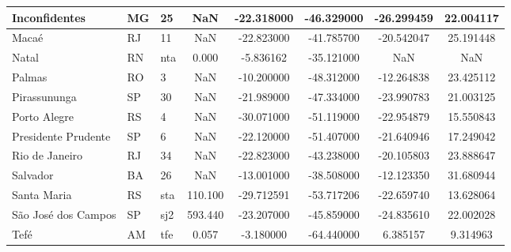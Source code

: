 \begin{table}
\begin{tabular}{|l|l|l|c|c|c|c|c|}
Inconfidentes       &    MG &                    25 &       NaN & -22.318000 & -46.329000 &    -26.299459 &      22.004117   \\ \hline
Macaé               &    RJ &                    11 &       NaN & -22.823000 & -41.785700 &    -20.542047 &      25.191448   \\ \hline
Natal               &    RN &                   nta &     0.000 &  -5.836162 & -35.121000 &           NaN &            NaN   \\ \hline
Palmas              &    RO &                     3 &       NaN & -10.200000 & -48.312000 &    -12.264838 &      23.425112   \\ \hline
Pirassununga        &    SP &                    30 &       NaN & -21.989000 & -47.334000 &    -23.990783 &      21.003125   \\ \hline
Porto Alegre        &    RS &                     4 &       NaN & -30.071000 & -51.119000 &    -22.954879 &      15.550843   \\ \hline
Presidente Prudente &    SP &                     6 &       NaN & -22.120000 & -51.407000 &    -21.640946 &      17.249042   \\ \hline
Rio de Janeiro      &    RJ &                    34 &       NaN & -22.823000 & -43.238000 &    -20.105803 &      23.888647   \\ \hline
Salvador            &    BA &                    26 &       NaN & -13.001000 & -38.508000 &    -12.123350 &      31.680944   \\ \hline
Santa Maria         &    RS &                   sta &   110.100 & -29.712591 & -53.717206 &    -22.659740 &      13.628064   \\ \hline
São José dos Campos &    SP &                   sj2 &   593.440 & -23.207000 & -45.859000 &    -24.835610 &      22.002028   \\ \hline
Tefé                &    AM &                   tfe &     0.057 &  -3.180000 & -64.440000 &      6.385157 &       9.314963   \\ \hline
\end{tabular}

\vspace{12pt}


\end{table}

